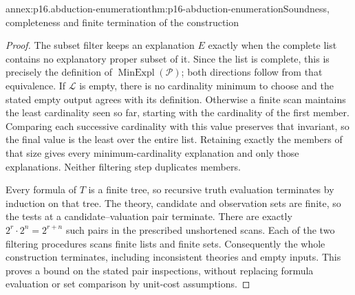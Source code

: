 \begin{annexitem}{annex:p16.abduction-enumeration}{thm:p16-abduction-enumeration}{Soundness, completeness and finite termination of the construction}
\begin{proof}
The subset filter keeps an explanation \(E\) exactly when the complete
list contains no explanatory proper subset of it. Since the list is
complete, this is precisely the definition of
\(\operatorname{MinExpl}(\mathcal P)\); both directions follow from
that equivalence. If \(\mathcal L\) is empty, there is no cardinality
minimum to choose and the stated empty output agrees with its definition.
Otherwise a finite scan maintains the least cardinality seen so far,
starting with the cardinality of the first member. Comparing each
successive cardinality with this value preserves that invariant, so the
final value is the least over the entire list. Retaining exactly the
members of that size gives every minimum-cardinality explanation and only
those explanations. Neither filtering step duplicates members.

Every formula of \(T\) is a finite tree, so recursive truth evaluation
terminates by induction on that tree. The theory, candidate and observation
sets are finite, so the tests at a candidate--valuation pair terminate.
There are exactly \(2^r\cdot2^n=2^{r+n}\) such pairs in the prescribed
unshortened scans. Each of the two filtering procedures scans finite lists
and finite sets. Consequently the whole construction terminates, including
inconsistent theories and empty inputs. This proves a bound on the stated
pair inspections, without replacing formula evaluation or set comparison
by unit-cost assumptions.
\end{proof}
\end{annexitem}

